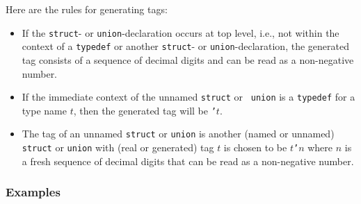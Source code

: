 \documentclass[titlepage,letterpaper]{article}
\begin{document}
Here are the rules for generating tags:

\begin{itemize}\setlength{\itemsep}{0pt}
\item If the {\tt struct}- or {\tt union}-declaration occurs at top
  level, i.e., not within the context of a {\tt typedef} or another
  {\tt struct}- or {\tt union}-declaration, the generated tag consists
  of a sequence of decimal digits and can be read as a non-negative
  number.
\item If the immediate context of the unnamed {\tt struct} or {\tt
    union} is a {\tt typedef} for a type name $t$, then the generated
  tag will be {\tt '$t$}.
\item The tag of an unnamed {\tt struct} or {\tt union} is another
  (named or unnamed) {\tt struct} or {\tt union} with (real or
  generated) tag $t$ is chosen to be {\tt $t$'$n$} where $n$ is a
  fresh sequence of decimal digits that can be read as a non-negative
  number.
\end{itemize}

\subsubsection*{Examples}
\end{document}
